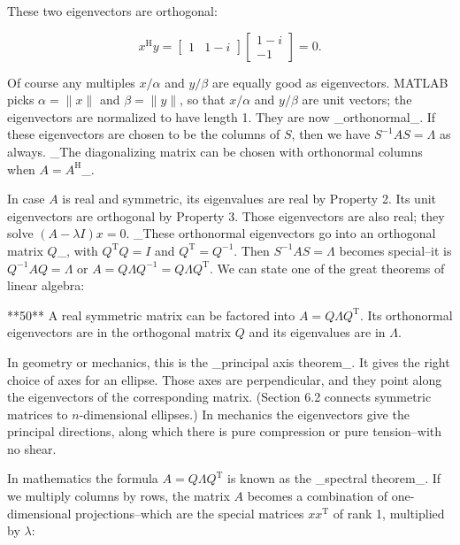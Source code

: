 These two eigenvectors are orthogonal:

\[x^{\mathrm{H}}y=\begin{bmatrix}1&1-i\end{bmatrix}\begin{bmatrix}1-i\\ -1\end{bmatrix}=0.\]

Of course any multiples \(x/\alpha\) and \(y/\beta\) are equally good as eigenvectors. MATLAB picks \(\alpha=\|x\|\) and \(\beta=\|y\|\), so that \(x/\alpha\) and \(y/\beta\) are unit vectors; the eigenvectors are normalized to have length 1. They are now _orthonormal_. If these eigenvectors are chosen to be the columns of \(S\), then we have \(S^{-1}AS=\Lambda\) as always. _The diagonalizing matrix can be chosen with orthonormal columns when \(A=A^{\mathrm{H}}\)_.

In case \(A\) is real and symmetric, its eigenvalues are real by Property 2. Its unit eigenvectors are orthogonal by Property 3. Those eigenvectors are also real; they solve \((A-\lambda I)x=0\). _These orthonormal eigenvectors go into an orthogonal matrix \(Q\)_, with \(Q^{\mathrm{T}}Q=I\) and \(Q^{\mathrm{T}}=Q^{-1}\). Then \(S^{-1}AS=\Lambda\) becomes special--it is \(Q^{-1}AQ=\Lambda\) or \(A=Q\Lambda Q^{-1}=Q\Lambda Q^{\mathrm{T}}\). We can state one of the great theorems of linear algebra:

**50** A real symmetric matrix can be factored into \(A=Q\Lambda Q^{\mathrm{T}}\). Its orthonormal eigenvectors are in the orthogonal matrix \(Q\) and its eigenvalues are in \(\Lambda\).

In geometry or mechanics, this is the _principal axis theorem_. It gives the right choice of axes for an ellipse. Those axes are perpendicular, and they point along the eigenvectors of the corresponding matrix. (Section 6.2 connects symmetric matrices to \(n\)-dimensional ellipses.) In mechanics the eigenvectors give the principal directions, along which there is pure compression or pure tension--with no shear.

In mathematics the formula \(A=Q\Lambda Q^{\mathrm{T}}\) is known as the _spectral theorem_. If we multiply columns by rows, the matrix \(A\) becomes a combination of one-dimensional projections--which are the special matrices \(xx^{\mathrm{T}}\) of rank 1, multiplied by \(\lambda\):

